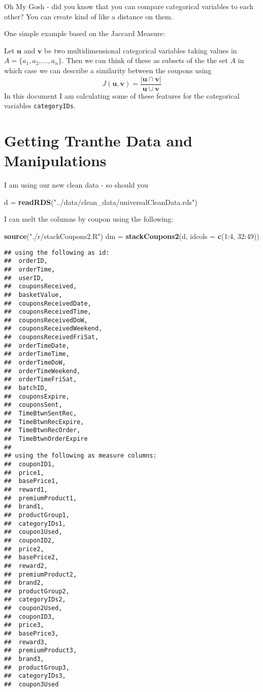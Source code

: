 \documentclass[10pt]{report}
\newenvironment{Shaded}{}{}
\newcommand{\KeywordTok}[1]{\textcolor[rgb]{0.00,0.44,0.13}{\textbf{{#1}}}}
\newcommand{\DataTypeTok}[1]{\textcolor[rgb]{0.56,0.13,0.00}{{#1}}}
\newcommand{\DecValTok}[1]{\textcolor[rgb]{0.25,0.63,0.44}{{#1}}}
\newcommand{\StringTok}[1]{\textcolor[rgb]{0.25,0.44,0.63}{{#1}}}
\newcommand{\NormalTok}[1]{{#1}}
\begin{document}
Oh My Gosh - did you know that you can compare categorical variables to
each other? You can create kind of like a distance on them.

One simple example based on the Jaccard Measure:

Let \(\mathbf{u}\) and \(\mathbf{v}\) be two multidimensional
categorical variables taking values in
\(A = \{a_1, a_2, \ldots, a_n\}\). Then we can think of these as subsets
of the the set \(A\) in which case we can describe a similarity between
the coupons using \[
   J(\mathbf{u}, \mathbf{v}) = \dfrac{| \mathbf{u} \cap \mathbf{v} |}{ \mathbf{u} \cup \mathbf{v}}
\] In this document I am calculating some of these features for the
categorical variables \verb!categoryIDs!.

\section{Getting Tranthe Data and
Manipulations}\label{getting-tranthe-data-and-manipulations}

I am using our new clean data - so should you

\begin{Shaded}
\begin{Highlighting}[]
\NormalTok{d =}\StringTok{ }\KeywordTok{readRDS}\NormalTok{(}\StringTok{"../data/clean_data/universalCleanData.rds"}\NormalTok{)}
\end{Highlighting}
\end{Shaded}

I can melt the columns by coupon using the following:

\begin{Shaded}
\begin{Highlighting}[]
\KeywordTok{source}\NormalTok{(}\StringTok{"./r/stackCoupons2.R"}\NormalTok{)}
\NormalTok{dm =}\StringTok{ }\KeywordTok{stackCoupons2}\NormalTok{(d, }\DataTypeTok{idcols =} \KeywordTok{c}\NormalTok{(}\DecValTok{1}\NormalTok{:}\DecValTok{4}\NormalTok{, }\DecValTok{32}\NormalTok{:}\DecValTok{49}\NormalTok{))}
\end{Highlighting}
\end{Shaded}

\begin{verbatim}
## using the following as id:
##  orderID,
##  orderTime,
##  userID,
##  couponsReceived,
##  basketValue,
##  couponsReceivedDate,
##  couponsReceivedTime,
##  couponsReceivedDoW,
##  couponsReceivedWeekend,
##  couponsReceivedFriSat,
##  orderTimeDate,
##  orderTimeTime,
##  orderTimeDoW,
##  orderTimeWeekend,
##  orderTimeFriSat,
##  batchID,
##  couponsExpire,
##  couponsSent,
##  TimeBtwnSentRec,
##  TimeBtwnRecExpire,
##  TimeBtwnRecOrder,
##  TimeBtwnOrderExpire
## 
## using the following as measure columns:
##  couponID1,
##  price1,
##  basePrice1,
##  reward1,
##  premiumProduct1,
##  brand1,
##  productGroup1,
##  categoryIDs1,
##  coupon1Used,
##  couponID2,
##  price2,
##  basePrice2,
##  reward2,
##  premiumProduct2,
##  brand2,
##  productGroup2,
##  categoryIDs2,
##  coupon2Used,
##  couponID3,
##  price3,
##  basePrice3,
##  reward3,
##  premiumProduct3,
##  brand3,
##  productGroup3,
##  categoryIDs3,
##  coupon3Used
\end{verbatim}
\end{document}

